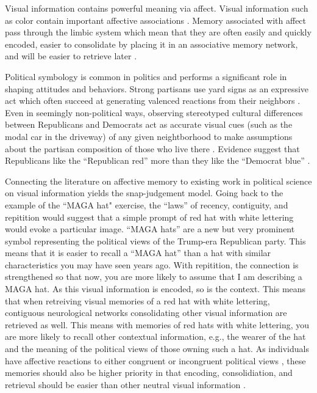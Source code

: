\documentclass [12pt]{article}
\begin{document}
Visual information contains powerful meaning via affect. Visual information such as color contain important affective associations \citep{cimbalo_et-al_1978_jgp}. Memory associated with affect pass through the limbic system which mean that they are often easily and quickly encoded, easier to consolidate by placing it in an associative memory network, and will be easier to retrieve later \citep{kensinger_fields_2022_ohhum}.

Political symbology is common in politics and performs a significant role in shaping attitudes and behaviors. Strong partisans use yard signs as an expressive act which often succeed at generating valenced reactions from their neighbors \citep{makse_et-al_2019_oup}. Even in seemingly non-political ways, observing stereotyped cultural differences between Republicans and Democrats act as accurate visual cues (such as the modal car in the driveway) of any given neightborhood to make assumptions about the partisan composition of those who live there \citep{hetherington_weiler_2018_hmh}. Evidence suggest that Republicans like the ``Republican red'' more than they like the ``Democrat blue'' \citep{schloss_palmer_2014_pbr}. 

Connecting the literature on affective memory to existing work in political science on visual information yields the snap-judgement model. Going back to the example of the ``MAGA hat" exercise, the ``laws'' of recency, contiguity, and repitition \citep{kahana_et-al_2022_ohhum} would suggest that a simple prompt of red hat with white lettering would evoke a particular image. ``MAGA hats'' are a new but very prominent symbol representing the political views of the Trump-era Republican party. This means that it is easier to recall a ``MAGA hat'' than a hat with similar characteristics you may have seen years ago. With repitition, the connection is strengthened so that now, you are more likely to assume that I am describing a MAGA hat. As this visual information is encoded, so is the context. This means that when retreiving visual memories of a red hat with white lettering, contiguous neurological networks consolidating other visual information are retrieved as well. This means with memories of red hats with white lettering, you are more likely to recall other contextual information, e.g., the wearer of the hat and the meaning of the political views of those owning such a hat. As individuals have affective reactions to either congruent or incongruent political views \citep{iyengar_westwood_2015, druckman_levendusky_2019}, these memories should also be higher priority in that encoding, consolidiation, and retrieval should be easier than other neutral visual information \citep{kensinger_fields_2022_ohhum}. 
\end{document}
